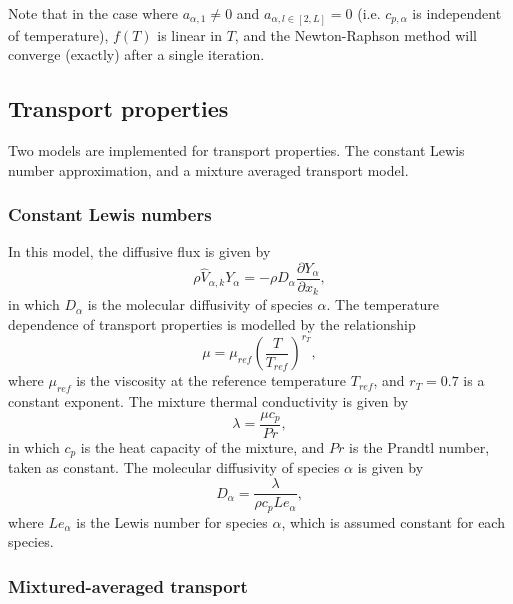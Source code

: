 \documentclass[notitlepage]{revtex4-1}
\begin{document}
Note that in the case where $a_{\alpha,1}\ne0$ and $a_{\alpha,l\in\left[2,L\right]}=0$ (i.e. $c_{p,\alpha}$ is independent of temperature), $f\left(T\right)$ is linear in $T$, and the Newton-Raphson method will converge (exactly) after a single iteration.

\subsection{Transport properties}

Two models are implemented for transport properties. The constant Lewis number approximation, and a mixture averaged transport model.

\subsubsection{Constant Lewis numbers}

In this model, the diffusive flux is given by
\begin{equation}\rho\hat{V}_{\alpha,k}Y_{\alpha}=-\rho{D}_{\alpha}\frac{\partial{Y}_{\alpha}}{\partial{x}_{k}},\end{equation}
in which $D_{\alpha}$ is the molecular diffusivity of species $\alpha$. The temperature dependence of transport properties is modelled by the relationship
\begin{equation}\mu=\mu_{ref}\left(\frac{T}{T_{ref}}\right)^{r_{T}},\label{eq:tdtp_mu}\end{equation}
where $\mu_{ref}$ is the viscosity at the reference temperature $T_{ref}$, and $r_{T}=0.7$ is a constant exponent. The mixture thermal conductivity is given by
\begin{equation}\lambda=\frac{\mu{c}_{p}}{Pr},\end{equation}
in which $c_{p}$ is the heat capacity of the mixture, and $Pr$ is the Prandtl number, taken as constant. The molecular diffusivity of species $\alpha$ is given by
\begin{equation}D_{\alpha}=\frac{\lambda}{\rho{c}_{p}Le_{\alpha}},\end{equation}
where $Le_{\alpha}$ is the Lewis number for species $\alpha$, which is assumed constant for each species.

\subsubsection{Mixtured-averaged transport}
\end{document}
